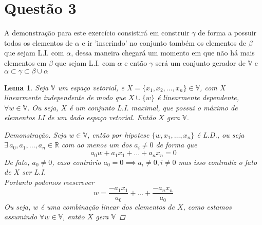 \documentclass[12pt,letterpaper]{article}
\newtheorem{lemma}{Lema}
\begin{document}
\newpage
\section*{Questão 3}
A demonstração para este exercício consistirá em construir \(\gamma\) de forma a possuir todos os elementos de \(\alpha\) e ir 'inserindo' no conjunto também os elementos de \(\beta\) que sejam L.I. com \(\alpha\), dessa maneira chegará um momento em que não há mais elementos em \(\beta\) que sejam L.I. com \(\alpha\) e então \(\gamma\) será um conjunto gerador de \(\mathbb{V}\) e \(\alpha \subset \gamma \subset \beta \cup \alpha \)

\begin{lemma}
  Seja \(\mathbb{V}\) um espaço vetorial, e \(X = \{x_1, x_2, \dots, x_n \} \in \mathbb{V} \), com \(X\) linearmente independente de modo que \(X \cup \{w\}\) é linearmente dependente, \(\forall w \in \mathbb{V}\). Ou seja, \(X\) é um conjunto L.I. maximal, que possui o máximo de elementos LI de um dado espaço vetorial. Então \(X\) gera \(\mathbb{V}\).
  \begin{proof}[Demonstração]
    Seja \(w \in \mathbb{V}\), então por hipotese \(\{w,x_1,\dots,x_n\}\) é L.D., ou seja \(\exists \, a_0,a_1,\dots,a_n \in \mathbb{R}\) com ao menos um dos \(a_i \neq 0\) de forma que
    \[
    a_0w + a_1x_1 + \dots + a_nx_n = 0
    \]
    De fato, \(a_0 \neq 0\), caso contrário \(a_0 = 0 \implies a_i \neq 0, i \neq 0\) mas isso contradiz o fato de \(X\) ser L.I.\\
    Portanto podemos reescrever
    \[
    w = \frac{-a_1x_1}{a_0} + \dots + \frac{-a_nx_n}{a_0}
    \]
    Ou seja, \(w\) é uma combinação linear dos elementos de \(X\), como estamos assumindo \(\forall w \in \mathbb{V}\), então \(X\) gera \(\mathbb{V}\)
  \end{proof}
\end{lemma}
\end{document}

